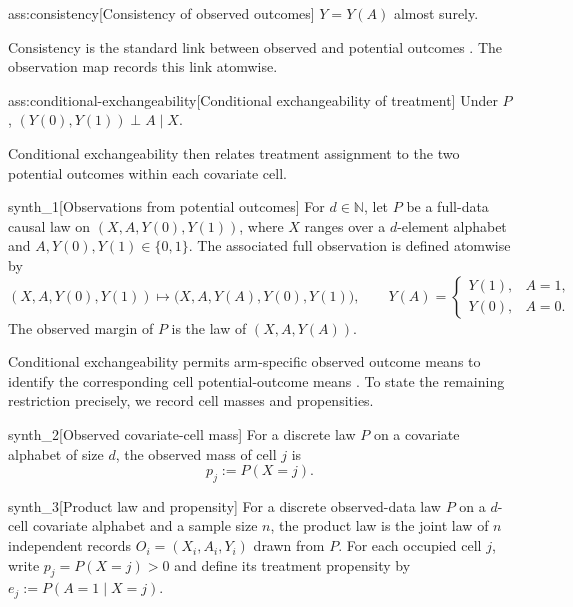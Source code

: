 \documentclass[11pt]{article}
\begin{document}
\begin{assumptionv}{ass:consistency}[Consistency of observed outcomes]
\(Y=Y(A)\) almost surely.
\end{assumptionv}

Consistency is the standard link between observed and potential outcomes \citep{HernanRobins2020}. The observation map records this link atomwise.

\begin{assumptionv}{ass:conditional-exchangeability}[Conditional exchangeability of treatment]
Under \(P\), \((Y(0),Y(1))\perp A\mid X\).
\end{assumptionv}

Conditional exchangeability then relates treatment assignment to the two potential outcomes within each covariate cell.

\begin{definitionv}{synth_1}[Observations from potential outcomes]
For \(d\in\mathbb N\), let \(P\) be a full-data causal law on \((X,A,Y(0),Y(1))\), where \(X\) ranges over a \(d\)-element alphabet and \(A,Y(0),Y(1)\in\{0,1\}\). The associated full observation is defined atomwise by
\[
(X,A,Y(0),Y(1))\longmapsto
\bigl(X,A,Y(A),Y(0),Y(1)\bigr),
\qquad
Y(A)=
\begin{cases}
Y(1),& A=1,\\
Y(0),& A=0.
\end{cases}
\]
The observed margin of \(P\) is the law of \((X,A,Y(A))\).
\end{definitionv}

Conditional exchangeability permits arm-specific observed outcome means to identify the corresponding cell potential-outcome means \citep{RosenbaumRubin1983}. To state the remaining restriction precisely, we record cell masses and propensities.

\begin{definitionv}{synth_2}[Observed covariate-cell mass]
For a discrete law \(P\) on a covariate alphabet of size \(d\), the observed mass of cell \(j\) is
\[
p_j := P(X=j).
\]
\end{definitionv}

\begin{definitionv}{synth_3}[Product law and propensity]
For a discrete observed-data law \(P\) on a \(d\)-cell covariate alphabet and a sample size \(n\), the product law is the joint law of \(n\) independent records \(O_i=(X_i,A_i,Y_i)\) drawn from \(P\). For each occupied cell \(j\), write \(p_j=P(X=j)>0\) and define its treatment propensity by \(e_j:=P(A=1\mid X=j)\).
\end{definitionv}
\end{document}

